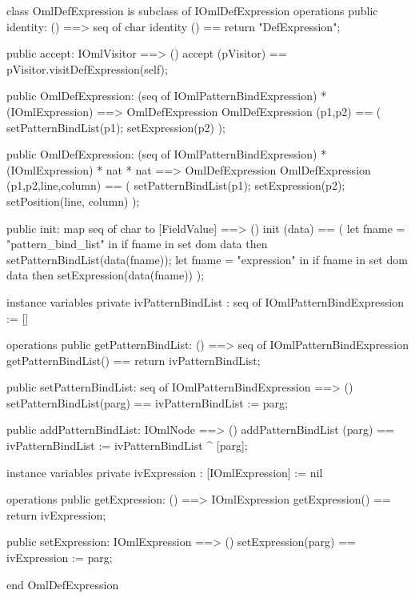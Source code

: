 \begin{vdm_al}
class OmlDefExpression is subclass of IOmlDefExpression
operations
  public identity: () ==> seq of char
  identity () == return "DefExpression";

  public accept: IOmlVisitor ==> ()
  accept (pVisitor) == pVisitor.visitDefExpression(self);

  public OmlDefExpression:
    (seq of IOmlPatternBindExpression) *
    (IOmlExpression) ==> OmlDefExpression
  OmlDefExpression (p1,p2) == 
    ( setPatternBindList(p1);
      setExpression(p2) );

  public OmlDefExpression:
    (seq of IOmlPatternBindExpression) *
    (IOmlExpression) *
    nat *
    nat ==> OmlDefExpression
  OmlDefExpression (p1,p2,line,column) == 
    ( setPatternBindList(p1);
      setExpression(p2);
      setPosition(line, column) );

  public init: map seq of char to [FieldValue] ==> ()
  init (data) ==
    ( let fname = "pattern_bind_list" in
        if fname in set dom data
        then setPatternBindList(data(fname));
      let fname = "expression" in
        if fname in set dom data
        then setExpression(data(fname)) );

instance variables
  private ivPatternBindList : seq of IOmlPatternBindExpression := []

operations
  public getPatternBindList: () ==> seq of IOmlPatternBindExpression
  getPatternBindList() == return ivPatternBindList;

  public setPatternBindList: seq of IOmlPatternBindExpression ==> ()
  setPatternBindList(parg) == ivPatternBindList := parg;

  public addPatternBindList: IOmlNode ==> ()
  addPatternBindList (parg) == ivPatternBindList := ivPatternBindList ^ [parg];

instance variables
  private ivExpression : [IOmlExpression] := nil

operations
  public getExpression: () ==> IOmlExpression
  getExpression() == return ivExpression;

  public setExpression: IOmlExpression ==> ()
  setExpression(parg) == ivExpression := parg;

end OmlDefExpression
\end{vdm_al}

